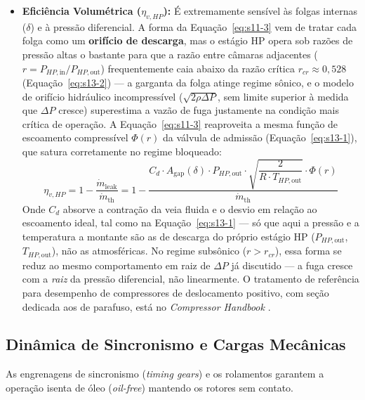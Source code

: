 \documentclass[12pt,a4paper]{article}
\numberwithin{equation}{section}
\numberwithin{table}{section}
\numberwithin{figure}{section}
\begin{document}
\begin{itemize}
		\item \textbf{Eficiência Volumétrica ($\eta_{v,HP}$):}
		É extremamente sensível às folgas internas ($\delta$) e à pressão diferencial. A forma da Equação~\eqref{eq:s11-3} vem de tratar cada folga como um \textbf{orifício de descarga}, mas o estágio HP opera sob razões de pressão altas o bastante para que a razão entre câmaras adjacentes ($r = P_{HP,\text{in}}/P_{HP,\text{out}}$) frequentemente caia abaixo da razão crítica $r_{cr} \approx 0{,}528$ (Equação~\eqref{eq:s13-2}) — a garganta da folga atinge regime sônico, e o modelo de orifício hidráulico incompressível ($\sqrt{2\rho\Delta P}$, sem limite superior à medida que $\Delta P$ cresce) superestima a vazão de fuga justamente na condição mais crítica de operação. A Equação~\eqref{eq:s11-3} reaproveita a mesma função de escoamento compressível $\Phi(r)$ da válvula de admissão (Equação~\eqref{eq:s13-1}), que satura corretamente no regime bloqueado:
		\begin{equation}\label{eq:s11-3}
 \eta_{v,HP} = 1 - \frac{\dot{m}_{\text{leak}}}{\dot{m}_{\text{th}}} = 1 - \frac{C_d \cdot A_{\text{gap}}(\delta) \cdot P_{HP,\text{out}} \cdot \sqrt{\dfrac{2}{R \cdot T_{HP,\text{out}}}} \cdot \Phi(r)}{\dot{m}_{\text{th}}}
\end{equation}
		Onde $C_d$ absorve a contração da veia fluida e o desvio em relação ao escoamento ideal, tal como na Equação~\eqref{eq:s13-1} — só que aqui a pressão e a temperatura a montante são as de descarga do próprio estágio HP ($P_{HP,\text{out}}$, $T_{HP,\text{out}}$), não as atmosféricas. No regime subsônico ($r > r_{cr}$), essa forma se reduz ao mesmo comportamento em raiz de $\Delta P$ já discutido — a fuga cresce com a \textit{raiz} da pressão diferencial, não linearmente. O tratamento de referência para desempenho de compressores de deslocamento positivo, com seção dedicada aos de parafuso, está no \textit{Compressor Handbook} \cite[Cap.~1 e 2]{hanlon}.
	\end{itemize}
	
	\subsection{\textbf{Dinâmica de Sincronismo e Cargas Mecânicas}}
	As engrenagens de sincronismo (\textit{timing gears}) e os rolamentos garantem a operação isenta de óleo (\textit{oil-free}) mantendo os rotores sem contato.
	
\end{document}

